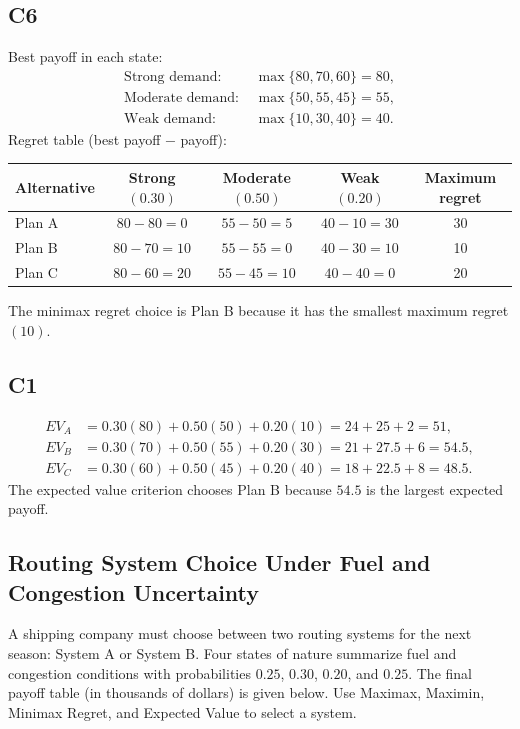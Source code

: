 \begin{ExamProblems}
		\subsection*{C6}
		Best payoff in each state:
		\[
		\begin{aligned}
			\text{Strong demand: } &\max\{80, 70, 60\} = 80, \\
			\text{Moderate demand: } &\max\{50, 55, 45\} = 55, \\
			\text{Weak demand: } &\max\{10, 30, 40\} = 40.
		\end{aligned}
		\]
		Regret table (best payoff $-$ payoff):
		\begin{center}
			\begin{tabular}{l c c c c}
				\toprule
				Alternative & Strong $(0.30)$ & Moderate $(0.50)$ & Weak $(0.20)$ & Maximum regret \\
				\midrule
				Plan A & $80-80=0$ & $55-50=5$ & $40-10=30$ & 30 \\
				Plan B & $80-70=10$ & $55-55=0$ & $40-30=10$ & 10 \\
				Plan C & $80-60=20$ & $55-45=10$ & $40-40=0$ & 20 \\
				\bottomrule
			\end{tabular}
		\end{center}
		The minimax regret choice is Plan B because it has the smallest maximum regret $(10)$.
		
		\subsection*{C1}
		\[
		\begin{aligned}
		EV_A &= 0.30(80)+0.50(50)+0.20(10)=24+25+2=51,\\
		EV_B &= 0.30(70)+0.50(55)+0.20(30)=21+27.5+6=54.5,\\
		EV_C &= 0.30(60)+0.50(45)+0.20(40)=18+22.5+8=48.5.
		\end{aligned}
		\]
		The expected value criterion chooses Plan B because $54.5$ is the largest expected payoff.
		
		\item
		\subsection*{Routing System Choice Under Fuel and Congestion Uncertainty}
		A shipping company must choose between two routing systems for the next season: System A or System B.
		Four states of nature summarize fuel and congestion conditions with probabilities $0.25$, $0.30$, $0.20$, and $0.25$.
		The final payoff table (in thousands of dollars) is given below. Use Maximax, Maximin, Minimax Regret, and Expected Value to select a system.
		

\end{ExamProblems}
